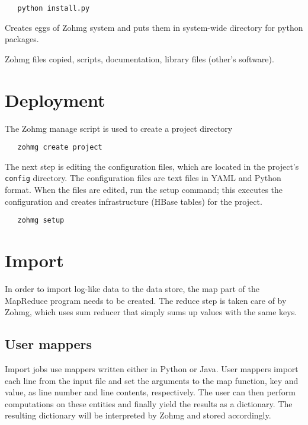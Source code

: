 \begin{verbatim}
   python install.py
\end{verbatim}

Creates eggs of Zohmg system and puts them in system-wide directory for python
packages.

Zohmg files copied, scripts, documentation, library files (other's software).


\section{Deployment}

The Zohmg manage script is used to create a project directory

\begin{verbatim}
   zohmg create project
\end{verbatim}

\noindent The next step is editing the configuration files, which are located in
the project's \texttt{config} directory. The configuration files are text files
in YAML and Python format. When the files are edited, run the setup command;
this executes the configuration and creates infrastructure (HBase tables) for
the project.

\begin{verbatim}
   zohmg setup
\end{verbatim}


\section{Import}

In order to import log-like data to the data store, the map part of the
MapReduce program needs to be created. The reduce step is taken care of by
Zohmg, which uses sum reducer that simply sums up values with the same keys.


\subsection*{User mappers}

Import jobs use mappers written either in Python or Java. User mappers import
each line from the input file and set the arguments to the map function, key and
value, as line number and line contents, respectively. The user can then perform
computations on these entities and finally yield the results as a dictionary.
The resulting dictionary will be interpreted by Zohmg and stored accordingly.

